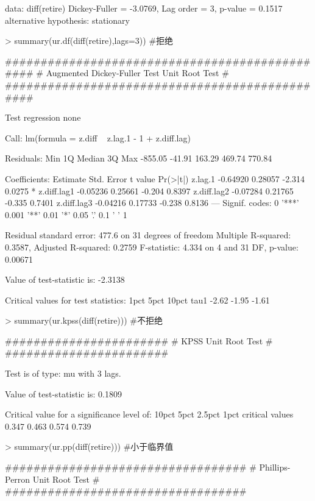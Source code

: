 \documentclass{article}
\begin{document}
\begin{Schunk}
\begin{Soutput}
data:  diff(retire)
Dickey-Fuller = -3.0769, Lag order = 3, p-value = 0.1517
alternative hypothesis: stationary
\end{Soutput}
\begin{Sinput}
> summary(ur.df(diff(retire),lags=3)) #拒绝
\end{Sinput}
\begin{Soutput}
############################################### 
# Augmented Dickey-Fuller Test Unit Root Test # 
############################################### 

Test regression none 


Call:
lm(formula = z.diff ~ z.lag.1 - 1 + z.diff.lag)

Residuals:
    Min      1Q  Median      3Q     Max 
-855.05  -41.91  163.29  469.74  770.84 

Coefficients:
            Estimate Std. Error t value Pr(>|t|)  
z.lag.1     -0.64920    0.28057  -2.314   0.0275 *
z.diff.lag1 -0.05236    0.25661  -0.204   0.8397  
z.diff.lag2 -0.07284    0.21765  -0.335   0.7401  
z.diff.lag3 -0.04216    0.17733  -0.238   0.8136  
---
Signif. codes:  0 '***' 0.001 '**' 0.01 '*' 0.05 '.' 0.1 ' ' 1

Residual standard error: 477.6 on 31 degrees of freedom
Multiple R-squared:  0.3587,	Adjusted R-squared:  0.2759 
F-statistic: 4.334 on 4 and 31 DF,  p-value: 0.00671


Value of test-statistic is: -2.3138 

Critical values for test statistics: 
      1pct  5pct 10pct
tau1 -2.62 -1.95 -1.61
\end{Soutput}
\begin{Sinput}
> summary(ur.kpss(diff(retire))) #不拒绝
\end{Sinput}
\begin{Soutput}
####################### 
# KPSS Unit Root Test # 
####################### 

Test is of type: mu with 3 lags. 

Value of test-statistic is: 0.1809 

Critical value for a significance level of: 
                10pct  5pct 2.5pct  1pct
critical values 0.347 0.463  0.574 0.739
\end{Soutput}
\begin{Sinput}
> summary(ur.pp(diff(retire))) #小于临界值
\end{Sinput}
\begin{Soutput}
################################## 
# Phillips-Perron Unit Root Test # 
################################## 


\end{Soutput}
\end{Schunk}
\end{document}
